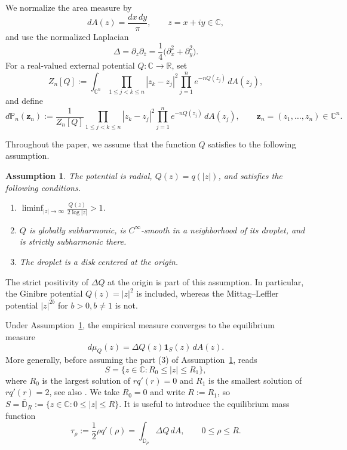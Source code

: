 \documentclass[a4paper]{article}
\newtheorem{assumption}[theorem]{Assumption}
\newcommand{\C}{\mathbb{C}}
\newcommand{\R}{\mathbb{R}}
\numberwithin{equation}{section}
\begin{document}
We normalize the area measure by
\[
dA(z)=\frac{dx\,dy}{\pi},\qquad z=x+iy\in\C,
\]
and use the normalized Laplacian
\[
\Delta=\partial_z\partial_{\bar z}
=\frac14\bigl(\partial_x^2+\partial_y^2\bigr).
\]
For a real-valued external potential $Q:\C\to\R$, set
\begin{equation}
\label{def of det partition function}
Z_n[Q]
:=
\int_{\C^n}
\prod_{1\leq j<k\leq n}|z_k-z_j|^2
\prod_{j=1}^n e^{-nQ(z_j)}\,dA(z_j),
\end{equation}
and define
\begin{equation}
\label{def of Pn soft}
d\mathbb P_n(\boldsymbol z_n)
:=
\frac{1}{Z_n[Q]}
\prod_{1\leq j<k\leq n}|z_k-z_j|^2
\prod_{j=1}^n e^{-nQ(z_j)}\,dA(z_j),
\qquad \boldsymbol z_n=(z_1,\ldots,z_n)\in\C^n.
\end{equation}

Throughout the paper, we assume that the function $Q$ satisfies to the following assumption.

\begin{assumption}\label{Assumption_Q}
The potential is radial, $Q(z)=q(|z|)$, and satisfies the following conditions.
\begin{enumerate}[label=\textup{(\arabic*)}]
\item\label{Assumption 1}
$\displaystyle \liminf_{|z|\to\infty}\frac{Q(z)}{2\log|z|}>1$.
\item\label{Assumption 2}
$Q$ is globally subharmonic, is $C^\infty$-smooth in a neighborhood of its droplet, and is strictly subharmonic there.
\item The droplet is a disk centered at the origin.
\end{enumerate}
\end{assumption}

The strict positivity of $\Delta Q$ at the origin is part of this
assumption.  In particular, the Ginibre potential $Q(z)=|z|^2$ is
included, whereas the Mittag--Leffler potential $|z|^{2b}$ for $b>0,b\neq 1$ is
not.

Under Assumption~\ref{Assumption_Q}, the empirical measure converges to the equilibrium measure
\[
d\mu_Q(z)=\Delta Q(z)\mathbf 1_S(z)\,dA(z).
\]
More generally, before assuming the part (3) of Assumption~\ref{Assumption_Q}, \cite[Section IV.6]{SaTo} reads
\begin{equation}
\label{def of droplet}
S=\{z\in\C:R_0\leq |z|\leq R_1\},
\end{equation}
where $R_0$ is the largest solution of $rq'(r)=0$ and $R_1$ is the smallest solution of $rq'(r)=2$, see also \cite{BKS2023}.  We take $R_0=0$ and write $R:=R_1$, so $S=\overline{\mathbb D}_R:=\{z\in\C:0\leq |z|\leq R\}$.  It is useful to introduce the equilibrium mass function
\begin{equation}
\tau_\rho:=\frac12\rho q'(\rho)
=\int_{\mathbb D_\rho}\Delta Q\,dA,
\qquad 0\leq \rho\leq R.
\end{equation}
\end{document}
